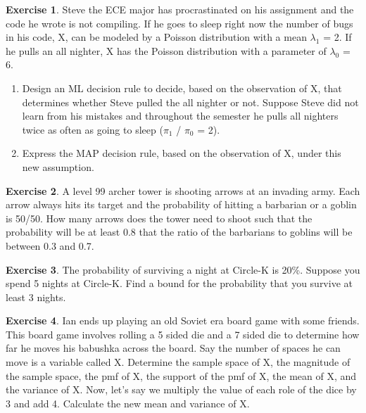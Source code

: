 \documentclass[12pt]{amsart}
\theoremstyle{definition}
\newtheorem{exercise}{Exercise}
\numberwithin{equation}{section}
\theoremstyle{plain}
\begin{document}
\begin{exercise}
Steve the ECE major has procrastinated on his assignment and the code he wrote is not compiling. If he goes to sleep right now the number of bugs in his code, X, can be modeled by a Poisson distribution with a mean $\lambda_1$ = 2. If he pulls an all nighter, X has the Poisson distribution with a parameter of $\lambda_0$ = 6. 
\begin{enumerate}
\item Design an ML decision rule to decide, based on the observation of X, that determines whether Steve pulled the all nighter or not.
Suppose Steve did not learn from his mistakes and throughout the semester he pulls all nighters twice as often as going to sleep ($\pi_1$ / $\pi_0$ = 2). \item Express the MAP decision rule, based on the observation of X, under this new assumption. 
\end{enumerate}
\end{exercise}

\begin{exercise}
A level 99 archer tower is shooting arrows at an invading army. Each arrow always hits its target and the probability of hitting a barbarian or a goblin is 50/50. How many arrows does the tower need to shoot such that the probability will be at least 0.8 that the ratio of the barbarians to goblins will be between 0.3 and 0.7.
\end{exercise}

\begin{exercise}
The probability of surviving a night at Circle-K is 20\%. Suppose you spend 5 nights at Circle-K. Find a bound for the probability that you survive at least 3 nights.
\end{exercise}

\begin{exercise}
Ian ends up playing an old Soviet era board game with some friends. This board game involves rolling a 5 sided die and a 7 sided die to determine how far he moves his babushka across the board. Say the number of spaces he can move is a variable called X. Determine the sample space of X, the magnitude of the sample space, the pmf of X, the support of the pmf of X, the mean of X, and the variance of X.
\newline
Now, let's say we multiply the value of each role of the dice by 3 and add 4. Calculate the new mean and variance of X.
\end{exercise}
\end{document}
